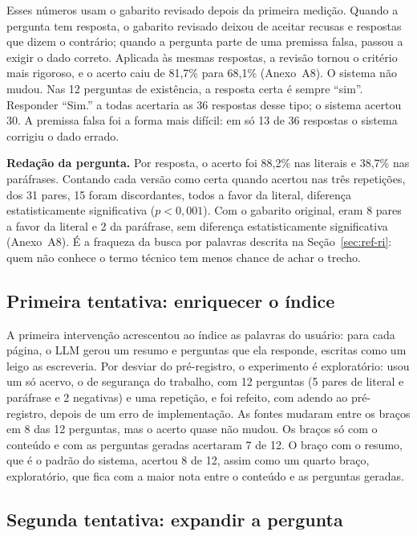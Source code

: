 \documentclass[12pt]{article}
\begin{document}
Esses números usam o gabarito revisado depois da primeira medição. Quando a pergunta tem resposta, o gabarito revisado deixou de aceitar recusas e respostas que dizem o contrário; quando a pergunta parte de uma premissa falsa, passou a exigir o dado correto. Aplicada às mesmas respostas, a revisão tornou o critério mais rigoroso, e o acerto caiu de 81,7\% para 68,1\% (Anexo~A8). O sistema não mudou. Nas 12 perguntas de existência, a resposta certa é sempre ``sim''. Responder ``Sim.'' a todas acertaria as 36 respostas desse tipo; o sistema acertou 30. A premissa falsa foi a forma mais difícil: em só 13 de 36 respostas o sistema corrigiu o dado errado.

\textbf{Redação da pergunta.} Por resposta, o acerto foi 88,2\% nas literais e 38,7\% nas paráfrases. Contando cada versão como certa quando acertou nas três repetições, dos 31 pares, 15 foram discordantes, todos a favor da literal, diferença estatisticamente significativa ($p < 0{,}001$). Com o gabarito original, eram 8 pares a favor da literal e 2 da paráfrase, sem diferença estatisticamente significativa (Anexo~A8). É a fraqueza da busca por palavras descrita na Seção~\ref{sec:ref-ri}: quem não conhece o termo técnico tem menos chance de achar o trecho.

\subsection{Primeira tentativa: enriquecer o índice}
\label{sec:res-enriquecimento}

A primeira intervenção acrescentou ao índice as palavras do usuário: para cada página, o LLM gerou um resumo e perguntas que ela responde, escritas como um leigo as escreveria. Por desviar do pré-registro, o experimento é exploratório: usou um só acervo, o de segurança do trabalho, com 12 perguntas (5 pares de literal e paráfrase e 2 negativas) e uma repetição, e foi refeito, com adendo ao pré-registro, depois de um erro de implementação. As fontes mudaram entre os braços em 8 das 12 perguntas, mas o acerto quase não mudou. Os braços só com o conteúdo e com as perguntas geradas acertaram 7 de 12. O braço com o resumo, que é o padrão do sistema, acertou 8 de 12, assim como um quarto braço, exploratório, que fica com a maior nota entre o conteúdo e as perguntas geradas.

\subsection{Segunda tentativa: expandir a pergunta}
\label{sec:res-expansao}
\end{document}
